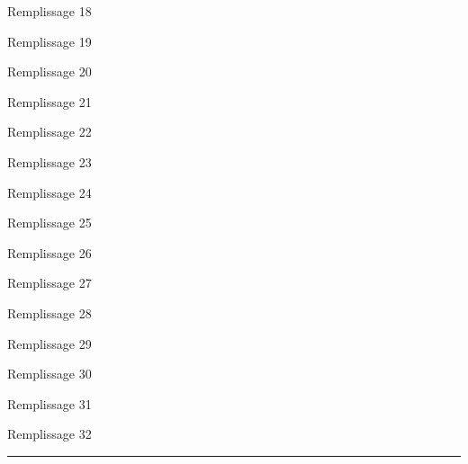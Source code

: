 \documentclass{article}
\begin{document}
{Remplissage 18

Remplissage 19

Remplissage 20

Remplissage 21

Remplissage 22

Remplissage 23

Remplissage 24

Remplissage 25

Remplissage 26

Remplissage 27

Remplissage 28

Remplissage 29

Remplissage 30

Remplissage 31

\exemplairepair Remplissage 32\fi

\vspace{4mm}\noindent\hrule


\begin{multicols}{3}
\AMCform
\end{multicols}

\AMCcleardoublepage

}
\end{document}
